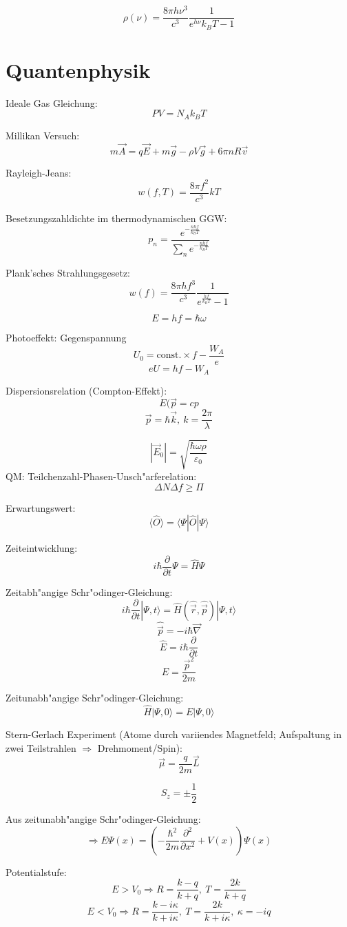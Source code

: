 \documentclass[12pt]{report}
\newcommand{\vabla}{\vec{\nabla}}
\newcommand{\vepsilon}{\varepsilon}
\begin{document}
\[\rho(\nu)=\frac{8\pi h\nu^3}{c^3}\frac{1}{e^{h\nu}{k_BT}-1}\]

\section{Quantenphysik}

Ideale Gas Gleichung:
\[PV=N_Ak_BT\]

Millikan Versuch:
\[m\vec{A}=q\vec{E}+m\vec{g}-\rho V\vec{g}+6\pi nR\vec{v}\]

Rayleigh-Jeans:
\[w(f,T)=\frac{8\pi f^2}{c^3}kT\]

Besetzungszahldichte im thermodynamischen GGW:
\[p_n=\frac{e^{-\frac{nhf}{k_BT}}}{\sum_ne^{-\frac{nhf}{k_BT}}}\]

Plank'sches Strahlungsgesetz:
\[w(f)=\frac{8\pi hf^3}{c^3}\frac{1}{e^\frac{hf}{k_BT}-1}\]

\[E=hf=\hbar\omega\]

Photoeffekt:
Gegenspannung
\[U_0=\mathrm{const.}\times f-\frac{W_A}{e}\]
\[eU=hf-W_A\]

Dispersionsrelation (Compton-Effekt):
\[E(\vec{p}=cp\]
\[\vec{p}=\hbar\vec{k},\ k=\frac{2\pi}{\lambda}\]

\[|\vec{E}_0|=\sqrt{\frac{\hbar\omega\rho}{\vepsilon_0}}\]
QM: Teilchenzahl-Phasen-Unsch"arferelation:
\[\Delta N\Delta f\geq\Pi\]

Erwartungswert:
\[\langle\hat{O}\rangle=\langle\Psi|\hat{O}|\Psi\rangle\]

Zeiteintwicklung:
\[i\hbar\frac{\partial}{\partial t}\Psi=\hat{H}\Psi\]

Zeitabh"angige Schr"odinger-Gleichung:
\[i\hbar\frac{\partial}{\partial t}|\Psi,t\rangle=\hat{H}(\hat{\vec{r}},\hat{\vec{p}})|\Psi,t\rangle\]
\[\hat{\vec{p}}=-i\hbar\vabla\]
\[\hat{E}=i\hbar\frac{\partial}{\partial t}\]
\[E=\frac{\vec{p}^2}{2m}\]

Zeitunabh"angige Schr"odinger-Gleichung:
\[\hat{H}|\Psi,0\rangle=E|\Psi,0\rangle\]

Stern-Gerlach Experiment (Atome durch variiendes Magnetfeld; Aufspaltung in zwei Teilstrahlen $\Rightarrow$ Drehmoment/Spin):
\[\vec{\mu}=\frac{q}{2m}\vec{L}\]

\[S_z=\pm\frac{1}{2}\]

Aus zeitunabh"angige Schr"odinger-Gleichung:
\[\Rightarrow E\Psi(x)=\left(-\frac{\hbar^2}{2m}\frac{\partial^2}{\partial x^2}+V(x)\right)\Psi(x)\]

Potentialstufe:
\[E>V_0\Rightarrow R=\frac{k-q}{k+q},\ T=\frac{2k}{k+q}\]
\[E<V_0\Rightarrow R=\frac{k-i\kappa}{k+i\kappa},\ T=\frac{2k}{k+i\kappa},\ \kappa=-iq\]
\end{document}
